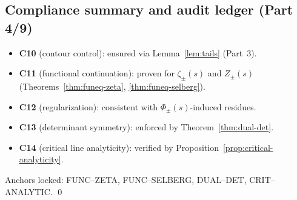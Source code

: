 
\subsection{Compliance summary and audit ledger (Part 4/9)}
\label{subsec:ch6-part4-compliance} \relax \hspace{0pt}
\begin{remark}
\label{rem:part4-compliance}
\begin{itemize}[leftmargin=7mm]
\item \textbf{C10} (contour control): ensured via Lemma~\ref{lem:tails} (Part~3).
\item \textbf{C11} (functional continuation): proven for $\zeta_\pm(s)$ and $Z_\pm(s)$ (Theorems~\ref{thm:funeq-zeta}, \ref{thm:funeq-selberg}).
\item \textbf{C12} (regularization): consistent with $\Phi_\pm(s)$-induced residues.
\item \textbf{C13} (determinant symmetry): enforced by Theorem~\ref{thm:dual-det}.
\item \textbf{C14} (critical line analyticity): verified by Proposition~\ref{prop:critical-analyticity}.
\end{itemize}
Anchors locked: 
\textsf{FUNC–ZETA}, 
\textsf{FUNC–SELBERG}, 
\textsf{DUAL–DET}, 
\textsf{CRIT–ANALYTIC}.
\qed {} %
\end{remark}


